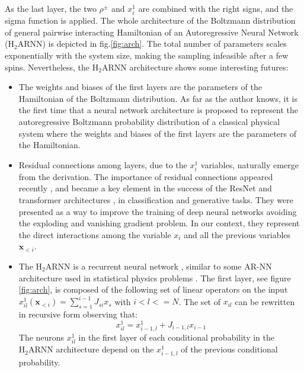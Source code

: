 \documentclass[aps,physrev,10pt,floatfix,reprint]{revtex4-2}
\begin{document}
As the last layer, the two $\rho^{\pm}$ and $x_i^1$ are combined with the right signs, and the sigma function is applied. The whole architecture of the Boltzmann distribution of general pairwise interacting Hamiltonian of an Autoregressive Neural Network ($\text{H}_2\text{ARNN}$) is depicted in fig.\ref{fig:arch}. The total number of parameters scales exponentially with the system size, making the sampling infeasible after a few spins.
Nevertheless, the $\text{H}_2\text{ARNN}$ architecture shows some interesting futures:
\begin{itemize}
    \item The weights and biases of the first layers are the parameters of the Hamiltonian of the Boltzmann distribution.  As far as the author knows, it is the first time that a neural network architecture is proposed to represent the autoregressive Boltzmann probability distribution of a classical physical system where the weights and biases of the first layers are the parameters of the Hamiltonian. 
    \item Residual connections among layers, due to the $x_i^1$ variables, naturally emerge from the derivation. 
    The importance of residual connections appeared recently \cite{10.48550/arxiv.1512.03385}, and became a key element in the success of the ResNet and transformer architectures \cite{vaswani2017attention}, in classification and generative tasks. They were presented as a way to improve the training of deep neural networks avoiding the exploding and vanishing gradient problem. In our context, they represent the direct interactions among the variable $x_i$ and all the previous variables $\mathbf{x}_{<i}$. 

    \item The $\text{H}_2\text{ARNN}$ is a recurrent neural network \cite{bengioNatureDeepLearning2015, https://doi.org/10.48550/arxiv.1506.00019}, similar to some AR-NN architecture used in statistical physics problems \cite{10.1038/s42256-021-00401-3, PhysRevResearch.2.023358}. 
    The first layer, see figure \ref{fig:arch}, is composed of the following set of linear operators on the input $x^1_{il}(\mathbf{x}_{<i})=\sum_{s=1}^{i-1} J_{si} x_s$ with $i<l<=N$. The set of $x_{il}$ can be rewritten in recursive form observing that:
    \begin{equation}
        x^1_{il} = x^1_{i-1,l} + J_{i-1,l} x_{i-1}
    \end{equation}
    The neurons $x^1_{il}$ in the first layer of each conditional probability in the $\text{H}_2\text{ARNN}$ architecture depend on the $x^1_{i-1,l}$ of the previous conditional probability.
\end{itemize}
\end{document}
